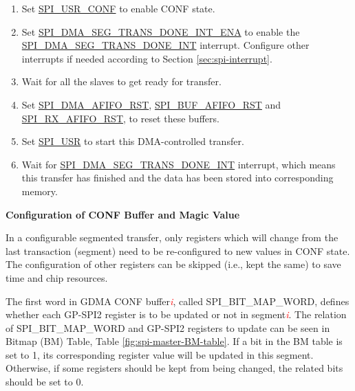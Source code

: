 \documentclass[main\_\_EN.tex]{subfiles}
\begin{document}
\begin{enumerate}
   \item Set \hyperref[fielddesc:SPIUSRCONF]{SPI\_USR\_CONF} to enable CONF state.
   \item Set \hyperref[fielddesc:SPIDMASEGTRANSDONEINTENA]{SPI\_DMA\_SEG\_TRANS\_DONE\_INT\_ENA} to enable the \hyperref[int:SPIDMASEGTRANSDONEINT]{SPI\_DMA\_SEG\_TRANS\_DONE\_INT} interrupt. Configure other interrupts if needed according to Section \ref{sec:spi-interrupt}. 

   \item Wait for all the slaves to get ready for transfer.
   
    \item Set \hyperref[fielddesc:SPIDMAAFIFORST]{SPI\_DMA\_AFIFO\_RST}, \hyperref[fielddesc:SPIBUFAFIFORST]{SPI\_BUF\_AFIFO\_RST} and \hyperref[fielddesc:SPIRXAFIFORST]{SPI\_RX\_AFIFO\_RST}, to reset these buffers.
   
   \item Set \hyperref[fielddesc:SPIUSR]{SPI\_USR} to start this DMA-controlled transfer.
   
   \item Wait for \hyperref[int:SPIDMASEGTRANSDONEINT]{SPI\_DMA\_SEG\_TRANS\_DONE\_INT} interrupt, which means this transfer has finished and the data has been stored into corresponding memory.
 \end{enumerate}

\textbf{Configuration of CONF Buffer and Magic Value}\label{sec:SCT-CONF-Buffer}

In a configurable segmented transfer, only registers which will change from the last transaction (segment) need to be re-configured to new values in CONF state. The configuration of other registers can be skipped (i.e., kept the same) to save time and chip resources. 

The first word in GDMA CONF buffer\textcolor{red}{\it i}, called SPI\_BIT\_MAP\_WORD, defines whether each GP-SPI2 register is to be updated or not in segment\textcolor{red}{\it i}. The relation of SPI\_BIT\_MAP\_WORD and GP-SPI2 registers to update can be seen in Bitmap (BM) Table, Table \ref{fig:spi-master-BM-table}. If a bit in the BM table is set to 1, its corresponding register value will be updated in this segment. Otherwise, if some registers should be kept from being changed, the related bits should be set to 0.
\end{document}

